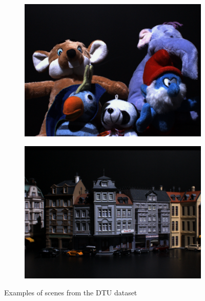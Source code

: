 \documentclass[thesis.tex]{subfiles}
\begin{document}
\begin{figure}
\begin{subfigure}{0.4\textwidth}
		\includegraphics[width=\textwidth]{img/dtu_example_3.png}
	\end{subfigure}
	\begin{subfigure}{0.4\textwidth}
		\includegraphics[width=\textwidth]{img/dtu_example_4.png}
	\end{subfigure}
	\caption{Examples of scenes from the DTU dataset}
	\label{fig:dtu_examples}
\end{figure}
\end{document}
